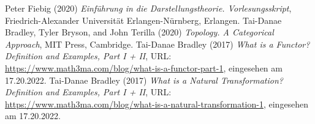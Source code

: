 \documentclass[leqno]{article}
\theoremstyle{plain}
\theoremstyle{definition}
\theoremstyle{remark}
\begin{document}
\begin{thebibliography}{9}
 Peter Fiebig (2020) \emph{Einführung in die Darstellungstheorie. Vorlesungsskript}, Friedrich-Alexander Universität Erlangen-Nürnberg, Erlangen.
 Tai-Danae Bradley, Tyler Bryson, and John Terilla (2020) \emph{Topology. A Categorical Approach}, MIT Press, Cambridge.
 Tai-Danae Bradley (2017) \emph{What is a Functor? Definition and Examples, Part I + II}, URL: \url{https://www.math3ma.com/blog/what-is-a-functor-part-1}, eingesehen am 17.20.2022.
 Tai-Danae Bradley (2017) \emph{What is a Natural Transformation? Definition and Examples, Part I + II}, URL: \url{https://www.math3ma.com/blog/what-is-a-natural-transformation-1}, eingesehen am 17.20.2022.
\end{thebibliography}
\end{document}
